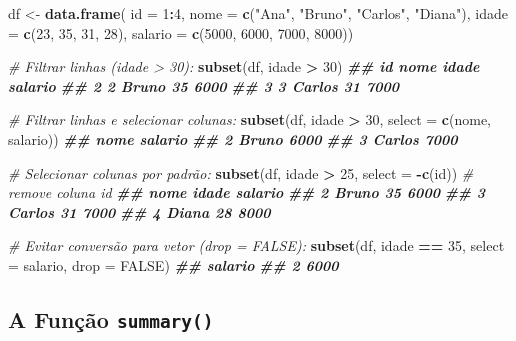 \documentclass[
]{book}
\newenvironment{Shaded}{\begin{snugshade}}{\end{snugshade}}
\newcommand{\AttributeTok}[1]{\textcolor[rgb]{0.13,0.29,0.53}{#1}}
\newcommand{\CommentTok}[1]{\textcolor[rgb]{0.56,0.35,0.01}{\textit{#1}}}
\newcommand{\ConstantTok}[1]{\textcolor[rgb]{0.56,0.35,0.01}{#1}}
\newcommand{\DecValTok}[1]{\textcolor[rgb]{0.00,0.00,0.81}{#1}}
\newcommand{\DocumentationTok}[1]{\textcolor[rgb]{0.56,0.35,0.01}{\textbf{\textit{#1}}}}
\newcommand{\FunctionTok}[1]{\textcolor[rgb]{0.13,0.29,0.53}{\textbf{#1}}}
\newcommand{\NormalTok}[1]{#1}
\newcommand{\OtherTok}[1]{\textcolor[rgb]{0.56,0.35,0.01}{#1}}
\newcommand{\SpecialCharTok}[1]{\textcolor[rgb]{0.81,0.36,0.00}{\textbf{#1}}}
\newcommand{\StringTok}[1]{\textcolor[rgb]{0.31,0.60,0.02}{#1}}
\begin{document}
\begin{Shaded}
\begin{Highlighting}[]
\NormalTok{df }\OtherTok{\textless{}{-}} \FunctionTok{data.frame}\NormalTok{(}
\AttributeTok{id =} \DecValTok{1}\SpecialCharTok{:}\DecValTok{4}\NormalTok{,}
\AttributeTok{nome =} \FunctionTok{c}\NormalTok{(}\StringTok{"Ana"}\NormalTok{, }\StringTok{"Bruno"}\NormalTok{, }\StringTok{"Carlos"}\NormalTok{, }\StringTok{"Diana"}\NormalTok{),}
\AttributeTok{idade =} \FunctionTok{c}\NormalTok{(}\DecValTok{23}\NormalTok{, }\DecValTok{35}\NormalTok{, }\DecValTok{31}\NormalTok{, }\DecValTok{28}\NormalTok{),}
\AttributeTok{salario =} \FunctionTok{c}\NormalTok{(}\DecValTok{5000}\NormalTok{, }\DecValTok{6000}\NormalTok{, }\DecValTok{7000}\NormalTok{, }\DecValTok{8000}\NormalTok{))}

\CommentTok{\# Filtrar linhas (idade \textgreater{} 30):}
\FunctionTok{subset}\NormalTok{(df, idade }\SpecialCharTok{\textgreater{}} \DecValTok{30}\NormalTok{)}
\DocumentationTok{\#\#   id   nome idade salario}
\DocumentationTok{\#\# 2  2  Bruno    35    6000}
\DocumentationTok{\#\# 3  3 Carlos    31    7000}

\CommentTok{\# Filtrar linhas e selecionar colunas:}
\FunctionTok{subset}\NormalTok{(df, idade }\SpecialCharTok{\textgreater{}} \DecValTok{30}\NormalTok{, }\AttributeTok{select =} \FunctionTok{c}\NormalTok{(nome, salario))}
\DocumentationTok{\#\#     nome salario}
\DocumentationTok{\#\# 2  Bruno    6000}
\DocumentationTok{\#\# 3 Carlos    7000}

\CommentTok{\# Selecionar colunas por padrão:}
\FunctionTok{subset}\NormalTok{(df, idade }\SpecialCharTok{\textgreater{}} \DecValTok{25}\NormalTok{, }\AttributeTok{select =} \SpecialCharTok{{-}}\FunctionTok{c}\NormalTok{(id))  }\CommentTok{\# remove coluna \textquotesingle{}id\textquotesingle{}}
\DocumentationTok{\#\#     nome idade salario}
\DocumentationTok{\#\# 2  Bruno    35    6000}
\DocumentationTok{\#\# 3 Carlos    31    7000}
\DocumentationTok{\#\# 4  Diana    28    8000}

\CommentTok{\# Evitar conversão para vetor (drop = FALSE):}
\FunctionTok{subset}\NormalTok{(df, idade }\SpecialCharTok{==} \DecValTok{35}\NormalTok{, }\AttributeTok{select =}\NormalTok{ salario, }\AttributeTok{drop =} \ConstantTok{FALSE}\NormalTok{)}
\DocumentationTok{\#\#   salario}
\DocumentationTok{\#\# 2    6000}
\end{Highlighting}
\end{Shaded}

\subsection{\texorpdfstring{A Função \texttt{summary()}}{A Função summary()}}\label{a-funuxe7uxe3o-summary}
\end{document}
